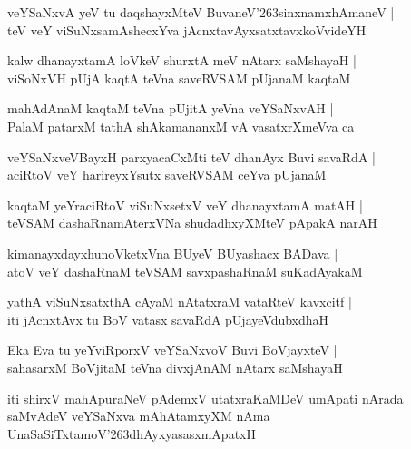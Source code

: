 \documentclass[twoside,12pt,openright]{book}
\def\S{\char'263}
\newcounter{shloka}[chapter]
\begin{document}
\begin{shloka}%
veYSaNxvA yeV tu daqshayxMteV BuvaneV\S sinxnamxhAmaneV |\\
teV veY viSuNxsamAshecxYva jAcnxtavAyxsatxtavxkoVvideYH
\end{shloka}

\begin{shloka}%
kalw dhanayxtamA loVkeV shurxtA meV nAtarx saMshayaH |\\
viSoNxVH pUjA kaqtA teVna saveRVSAM pUjanaM kaqtaM 
\end{shloka}

\begin{shloka}%
mahAdAnaM kaqtaM teVna pUjitA yeVna veYSaNxvAH |\\
PalaM patarxM tathA shAkamananxM vA vasatxrXmeVva ca 
\end{shloka}

\begin{shloka}%
veYSaNxveVBayxH parxyacaCxMti teV dhanAyx Buvi savaRdA |\\
aciRtoV veY harireyxYsutx saveRVSAM ceYva pUjanaM 
\end{shloka}

\begin{shloka}%
kaqtaM yeYraciRtoV viSuNxsetxV veY dhanayxtamA matAH |\\
teVSAM dashaRnamAterxVNa shudadhxyXMteV pApakA narAH 
\end{shloka}

\begin{shloka}%
kimanayxdayxhunoVketxVna BUyeV BUyashacx BADava |\\
atoV veY dashaRnaM teVSAM savxpashaRnaM suKadAyakaM
\end{shloka}

\begin{shloka}%
yathA viSuNxsatxthA cAyaM nAtatxraM vataRteV kavxcitf |\\
iti jAcnxtAvx tu BoV vatasx savaRdA pUjayeVdubxdhaH
\end{shloka}

\begin{shloka}%
Eka Eva tu yeYviRporxV veYSaNxvoV Buvi BoVjayxteV |\\
sahasarxM BoVjitaM teVna divxjAnAM nAtarx saMshayaH 
\end{shloka}

\begin{center}
iti shirxV mahApuraNeV pAdemxV utatxraKaMDeV umApati nArada saMvAdeV veYSaNxva mAhAtamxyXM nAma 
UnaSaSiTxtamoV\S dhAyxyasasxmApatxH 
\end{center}
\end{document}
